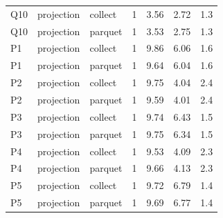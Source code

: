 \begin{tabular}{lllrrrr}
Q10 & projection & collect & 1 & 3.56 & 2.72 & 1.3 \\
Q10 & projection & parquet & 1 & 3.53 & 2.75 & 1.3 \\
P1 & projection & collect & 1 & 9.86 & 6.06 & 1.6 \\
P1 & projection & parquet & 1 & 9.64 & 6.04 & 1.6 \\
P2 & projection & collect & 1 & 9.75 & 4.04 & 2.4 \\
P2 & projection & parquet & 1 & 9.59 & 4.01 & 2.4 \\
P3 & projection & collect & 1 & 9.74 & 6.43 & 1.5 \\
P3 & projection & parquet & 1 & 9.75 & 6.34 & 1.5 \\
P4 & projection & collect & 1 & 9.53 & 4.09 & 2.3 \\
P4 & projection & parquet & 1 & 9.66 & 4.13 & 2.3 \\
P5 & projection & collect & 1 & 9.72 & 6.79 & 1.4 \\
P5 & projection & parquet & 1 & 9.69 & 6.77 & 1.4 \\
\bottomrule
\end{tabular}
